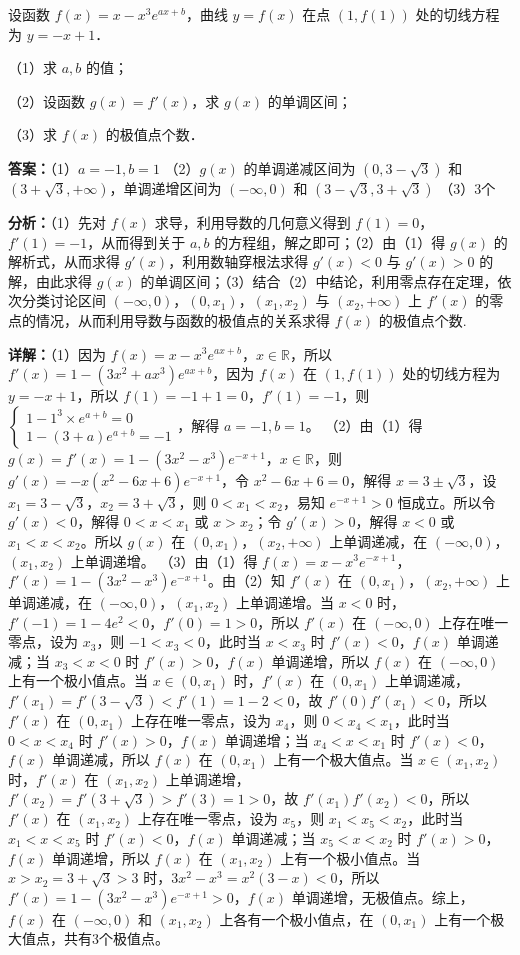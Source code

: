 \begin{question}[points=15]
设函数 $f(x) = x - x^3 e^{ax+b}$，曲线 $y=f(x)$ 在点 $(1,f(1))$ 处的切线方程为 $y = -x+1$．

（1）求 $a,b$ 的值；

（2）设函数 $g(x) = f'(x)$，求 $g(x)$ 的单调区间；

（3）求 $f(x)$ 的极值点个数．
\begin{solution}
\textbf{答案：}（1）$a=-1,b=1$ （2）$g(x)$ 的单调递减区间为 $(0,3-\sqrt{3})$ 和 $(3+\sqrt{3},+\infty)$，单调递增区间为 $(-\infty,0)$ 和 $(3-\sqrt{3},3+\sqrt{3})$ （3）3个

\textbf{分析：}（1）先对 $f(x)$ 求导，利用导数的几何意义得到 $f(1)=0$，$f'(1)=-1$，从而得到关于 $a,b$ 的方程组，解之即可；（2）由（1）得 $g(x)$ 的解析式，从而求得 $g'(x)$，利用数轴穿根法求得 $g'(x)<0$ 与 $g'(x)>0$ 的解，由此求得 $g(x)$ 的单调区间；（3）结合（2）中结论，利用零点存在定理，依次分类讨论区间 $(-\infty,0)$，$(0,x_1)$，$(x_1,x_2)$ 与 $(x_2,+\infty)$ 上 $f'(x)$ 的零点的情况，从而利用导数与函数的极值点的关系求得 $f(x)$ 的极值点个数.

\textbf{详解：}（1）因为 $f(x)=x-x^3e^{ax+b}$，$x\in\mathbb{R}$，所以 $f'(x)=1-(3x^2+ax^3)e^{ax+b}$，因为 $f(x)$ 在 $(1,f(1))$ 处的切线方程为 $y=-x+1$，所以 $f(1)=-1+1=0$，$f'(1)=-1$，则 $\begin{cases} 1-1^3\times e^{a+b}=0 \\ 1-(3+a)e^{a+b}=-1 \end{cases}$，解得 $a=-1,b=1$。
（2）由（1）得 $g(x)=f'(x)=1-(3x^2-x^3)e^{-x+1}$，$x\in\mathbb{R}$，则 $g'(x)=-x(x^2-6x+6)e^{-x+1}$，令 $x^2-6x+6=0$，解得 $x=3\pm\sqrt{3}$，设 $x_1=3-\sqrt{3}$，$x_2=3+\sqrt{3}$，则 $0<x_1<x_2$，易知 $e^{-x+1}>0$ 恒成立。所以令 $g'(x)<0$，解得 $0<x<x_1$ 或 $x>x_2$；令 $g'(x)>0$，解得 $x<0$ 或 $x_1<x<x_2$。所以 $g(x)$ 在 $(0,x_1)$，$(x_2,+\infty)$ 上单调递减，在 $(-\infty,0)$，$(x_1,x_2)$ 上单调递增。
（3）由（1）得 $f(x)=x-x^3e^{-x+1}$，$f'(x)=1-(3x^2-x^3)e^{-x+1}$。由（2）知 $f'(x)$ 在 $(0,x_1)$，$(x_2,+\infty)$ 上单调递减，在 $(-\infty,0)$，$(x_1,x_2)$ 上单调递增。当 $x<0$ 时，$f'(-1)=1-4e^2<0$，$f'(0)=1>0$，所以 $f'(x)$ 在 $(-\infty,0)$ 上存在唯一零点，设为 $x_3$，则 $-1<x_3<0$，此时当 $x<x_3$ 时 $f'(x)<0$，$f(x)$ 单调递减；当 $x_3<x<0$ 时 $f'(x)>0$，$f(x)$ 单调递增，所以 $f(x)$ 在 $(-\infty,0)$ 上有一个极小值点。当 $x\in(0,x_1)$ 时，$f'(x)$ 在 $(0,x_1)$ 上单调递减，$f'(x_1)=f'(3-\sqrt{3})<f'(1)=1-2<0$，故 $f'(0)f'(x_1)<0$，所以 $f'(x)$ 在 $(0,x_1)$ 上存在唯一零点，设为 $x_4$，则 $0<x_4<x_1$，此时当 $0<x<x_4$ 时 $f'(x)>0$，$f(x)$ 单调递增；当 $x_4<x<x_1$ 时 $f'(x)<0$，$f(x)$ 单调递减，所以 $f(x)$ 在 $(0,x_1)$ 上有一个极大值点。当 $x\in(x_1,x_2)$ 时，$f'(x)$ 在 $(x_1,x_2)$ 上单调递增，$f'(x_2)=f'(3+\sqrt{3})>f'(3)=1>0$，故 $f'(x_1)f'(x_2)<0$，所以 $f'(x)$ 在 $(x_1,x_2)$ 上存在唯一零点，设为 $x_5$，则 $x_1<x_5<x_2$，此时当 $x_1<x<x_5$ 时 $f'(x)<0$，$f(x)$ 单调递减；当 $x_5<x<x_2$ 时 $f'(x)>0$，$f(x)$ 单调递增，所以 $f(x)$ 在 $(x_1,x_2)$ 上有一个极小值点。当 $x>x_2=3+\sqrt{3}>3$ 时，$3x^2-x^3=x^2(3-x)<0$，所以 $f'(x)=1-(3x^2-x^3)e^{-x+1}>0$，$f(x)$ 单调递增，无极值点。综上，$f(x)$ 在 $(-\infty,0)$ 和 $(x_1,x_2)$ 上各有一个极小值点，在 $(0,x_1)$ 上有一个极大值点，共有3个极值点。
\end{solution}
\end{question}

